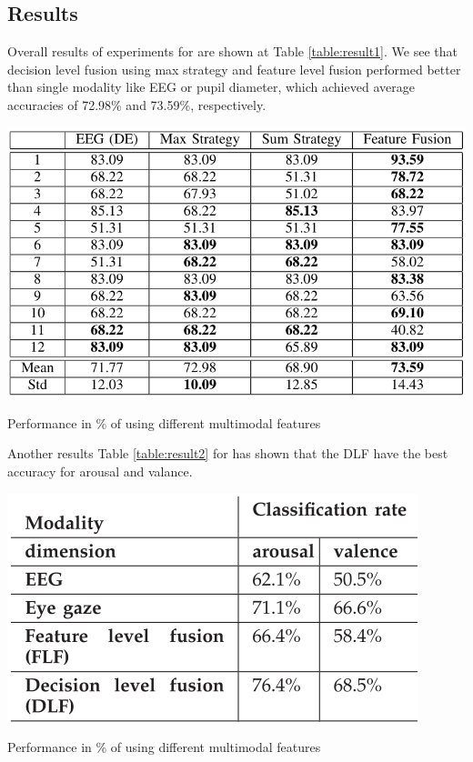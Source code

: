 \documentclass[10pt,journal,compsoc,twoside]{IEEEtran}
\newcommand{\Ref}[2]{#2 \ref{#1}}
\begin{document}
\subsection{Results}
Overall results of experiments for \cite{WeiLongBoNanBaoLiang2014} are shown at \Ref{table:result1}{Table}.
We see that decision level fusion using max strategy and feature level fusion performed better than single modality like EEG or pupil diameter, which achieved average accuracies of 72.98\% and 73.59\%, respectively.
\begin{table}[ht]
	\centering
	\includegraphics[width=1.0\linewidth]{result1}
	\caption{ Performance in \% of using different multimodal features \cite{WeiLongBoNanBaoLiang2014}}
	\label{table:result1}
\end{table}

Another results \Ref{table:result2}{Table} for \cite{SoleymaniPanticPun2002} has shown that the DLF have the best accuracy for arousal and valance. 

\begin{table}[ht]
	\centering
	\includegraphics[width=0.7\linewidth]{result2}
	\caption{ Performance in \% of using different multimodal features \cite{SoleymaniPanticPun2002}}
	\label{table:result2}
\end{table}
\end{document}
